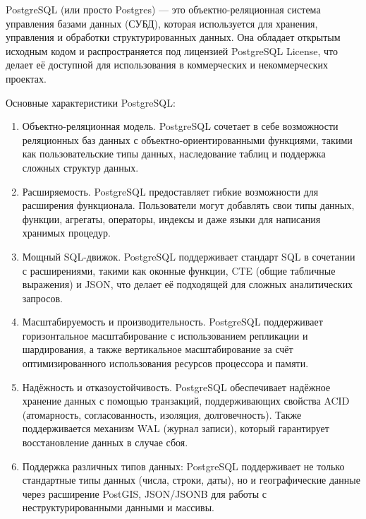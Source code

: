 \documentclass[pract]{SCWorks}
\begin{document}
PostgreSQL (или просто Postgres) — это объектно-реляционная система управления 
базами данных (СУБД), которая используется для хранения, управления и 
обработки структурированных данных. Она обладает открытым исходным кодом и 
распространяется под лицензией PostgreSQL License, что делает её доступной 
для использования в коммерческих и некоммерческих проектах.

Основные характеристики PostgreSQL:
\begin{enumerate}
    \item Объектно-реляционная модель. PostgreSQL сочетает в себе возможности 
    реляционных баз данных с объектно-ориентированными функциями, такими как 
    пользовательские типы данных, наследование таблиц и поддержка сложных 
    структур данных.

    \item Расширяемость.
    PostgreSQL предоставляет гибкие возможности для расширения функционала. 
    Пользователи могут добавлять свои типы данных, функции, агрегаты, 
    операторы, индексы и даже языки для написания хранимых процедур.

    \item Мощный SQL-движок.
    PostgreSQL поддерживает стандарт SQL в сочетании с расширениями, такими 
    как оконные функции, CTE (общие табличные выражения) и JSON, что делает 
    её подходящей для сложных аналитических запросов.

    \item Масштабируемость и производительность.
    PostgreSQL поддерживает горизонтальное масштабирование с использованием 
    репликации и шардирования, а также вертикальное масштабирование за счёт 
    оптимизированного использования ресурсов процессора и памяти.

    \item Надёжность и отказоустойчивость.
    PostgreSQL обеспечивает надёжное хранение данных с помощью транзакций, 
    поддерживающих свойства ACID (атомарность, согласованность, изоляция, 
    долговечность). Также поддерживается механизм WAL (журнал записи), который 
    гарантирует восстановление данных в случае сбоя.

    \item Поддержка различных типов данных:
    PostgreSQL поддерживает не только стандартные типы данных (числа, строки, 
    даты), но и географические данные через расширение PostGIS, JSON/JSONB 
    для работы с неструктурированными данными и массивы.
\end{enumerate}
\end{document}
